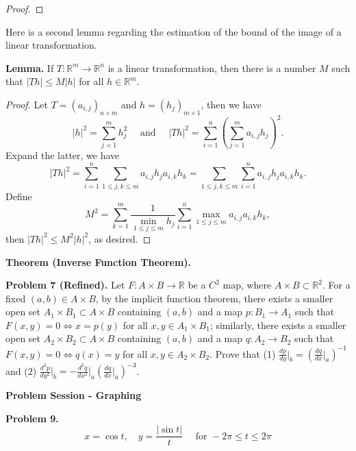 \documentclass[10pt]{article}
\begin{document}
\begin{proof}
\end{proof}

Here is a second lemma regarding the estimation of the bound of the image of a linear transformation.

\textbf{Lemma.} If $T:\mathbb{R}^m\to\mathbb{R}^n$ is a linear transformation, then there is a number $M$ such that $|Th|\leq M|h|$ for all $h\in\mathbb{R}^m$.
\begin{proof}
Let $T=(a_{i,j})_{n\times m}$ and $h=(h_j)_{m\times 1}$, then we have $$|h|^2=\sum_{j=1}^mh_j^2\quad\text{ and }\quad|Th|^2=\sum_{i=1}^n\left(\sum_{j=1}^ma_{i,j}h_j\right)^2.$$ Expand the latter, we have $$|Th|^2=\sum_{i=1}^n\sum_{1\leq j,k\leq m}a_{i,j}h_ja_{i,k}h_k=\sum_{1\leq j,k\leq m}\sum_{i=1}^na_{i,j}h_ja_{i,k}h_k.$$ Define $$M^2=\sum_{k=1}^m\frac{1}{\displaystyle\min_{1\leq j\leq m}h_j}\sum_{i=1}^n\max_{1\leq j\leq m}a_{i,j}a_{i,k}h_k,$$ then $|Th|^2\leq M^2|h|^2$, as desired.
\end{proof}

\textbf{Theorem (Inverse Function Theorem).}

\textbf{Problem 7 (Refined).} Let $F:A\times B\to\mathbb{R}$ be a $C^2$ map, where $A\times B\subset\mathbb{R}^2$. For a fixed $(a,b)\in A\times B$, by the implicit function theorem, there exists a smaller open set $A_1\times B_1\subset A\times B$ containing $(a,b)$ and a map $p:B_1\to A_1$ such that $F(x,y)=0\iff x=p(y)$ for all $x,y\in A_1\times B_1$; similarly, there exists a smaller open set $A_2\times B_2\subset A\times B$ containing $(a,b)$ and a map $q:A_2\to B_2$ such that $F(x,y)=0\iff q(x)=y$ for all $x,y\in A_2\times B_2$. Prove that (1) $\frac{dp}{dy}\Big|_b=\left(\frac{dq}{dx}\Big|_a\right)^{-1}$ and (2) $\frac{d^{2} p}{d y^{2}}\Big|_{b}=-\frac{d^{2} q}{d x^{2}}\Big|_{a}\left(\frac{d q}{d x}\Big|_{a}\right)^{-3}$.

\newpage
\begin{center}\textbf{\Large Problem Session - Graphing}\end{center}

\textbf{Problem 9.} $$x=\cos t, \quad y=\frac{|\sin t|}{t} \quad \text { for }-2 \pi \leq t \leq 2 \pi$$
\end{document}
